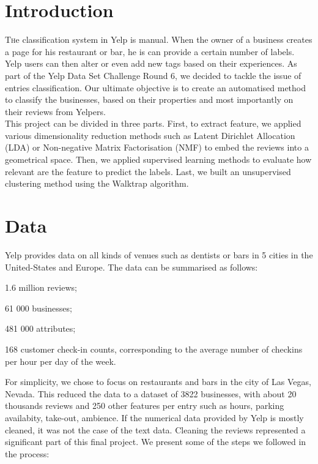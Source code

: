 \documentclass[twoside]{article}
\begin{document}
\begin{multicols}{2} %

\section{Introduction}

\lettrine[nindent=0em,lines=1]{T}he classification system in Yelp is manual. When the owner of a business creates a page for his restaurant or bar, he is can provide a certain number of labels. Yelp users can then alter or even add new tags based on their experiences. As part of the Yelp Data Set Challenge Round 6, we decided to tackle the issue of entries classification. Our ultimate objective is to create an automatised method to classify the businesses, based on their properties and most importantly on their reviews from Yelpers. \\

This project can be divided in three parts. First, to extract feature, we applied various dimensionality reduction methods such as Latent Dirichlet Allocation (LDA) or Non-negative Matrix Factorisation (NMF) to embed the reviews into a geometrical space. Then, we applied supervised learning methods to evaluate how relevant are the feature to predict the labels. Last, we built an unsupervised clustering method using the Walktrap algorithm.

\columnbreak
\section{Data}

Yelp provides data on all kinds of venues such as dentists or bars in 5 cities in the United-States and Europe. The data can be summarised as follows:

\begin{compactitem}
    \item 1.6 million reviews;
    \item 61 000 businesses;    
    \item 481 000 attributes; 
    \item 168 customer check-in counts, corresponding to the average number of checkins per hour per day of the week.
\end{compactitem}

\noindent For simplicity, we chose to focus on restaurants and bars in the city of Las Vegas, Nevada. This reduced the data to a dataset of 3822 businesses, with about 20 thousands reviews and 250 other features per entry such as hours, parking availabity, take-out, ambience. If the numerical data provided by Yelp is mostly cleaned, it was not the case of the text data. Cleaning the reviews represented a significant part of this final project. We present some of the steps we followed in the process:\\


\end{multicols}
\end{document}
